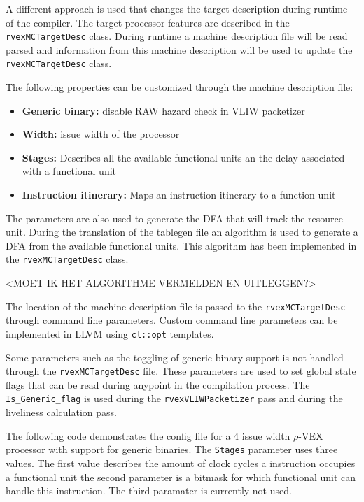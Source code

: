A different approach is used that changes the target description during runtime of the compiler. The target processor features are described in the \texttt{rvexMCTargetDesc} class. During runtime a machine description file will be read parsed and information from this machine description will be used to update the \texttt{rvexMCTargetDesc} class. 

The following properties can be customized through the machine description file:

\begin{itemize}
  \item \textbf{Generic binary:} disable RAW hazard check in VLIW packetizer
  \item \textbf{Width:} issue width of the processor
  \item \textbf{Stages:} Describes all the available functional units an the delay associated with a functional unit
  \item \textbf{Instruction itinerary:} Maps an instruction itinerary to a function unit
\end{itemize}

The parameters are also used to generate the DFA that will track the resource unit. During the translation of the tablegen file an algorithm is used to generate a DFA from the available functional units. This algorithm has been implemented in the \texttt{rvexMCTargetDesc} class.

<MOET IK HET ALGORITHME VERMELDEN EN UITLEGGEN?>

The location of the machine description file is passed to the \texttt{rvexMCTargetDesc} through command line parameters. Custom command line parameters can be implemented in LLVM using \texttt{cl::opt} templates.

Some parameters such as the toggling of generic binary support is not handled through the \texttt{rvexMCTargetDesc} file. These parameters are used to set global state flags that can be read during anypoint in the compilation process. The \texttt{Is\_Generic\_flag} is used during the \texttt{rvexVLIWPacketizer} pass and during the liveliness calculation pass.

The following code demonstrates the config file for a 4 issue width  $\rho$-VEX processor with support for generic binaries. The \texttt{Stages} parameter uses three values. The first value describes the amount of clock cycles a instruction occupies a functional unit the second parameter is a bitmask for which functional unit can handle this instruction. The third paramater is currently not used.

